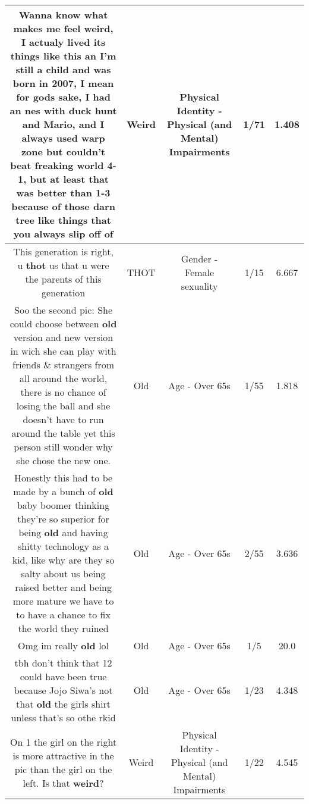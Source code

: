\documentclass[11pt]{article}
\newlength\mylength
\begin{document}
\begin{center}
\begin{longtable}{|C{.65\mylength}|C{.30\mylength}|C{.12\mylength}|C{.12\mylength}|C{.12\mylength}|}
  \small Wanna know what makes me feel \textbf{weird}, I actualy lived its things like this an I'm still a child and was born in 2007, I mean for gods sake, I had an nes with duck hunt and Mario, and I always used warp zone but couldn't beat freaking world 4-1, but at least that was better than 1-3 because of those darn tree like things that you always slip off of\normalsize   & Weird & Physical Identity - Physical (and Mental) Impairments & 1/71 & 1.408 \\  \hline
  \small This generation is right, u \textbf{thot} us that u were the parents of this generation\normalsize   & THOT & Gender - Female sexuality & 1/15 & 6.667 \\  \hline
  \small Soo the second pic: She could choose between \textbf{old} version and new version in wich she can play with friends \& strangers from all around the world, there is no chance of losing the ball and she doesn't have to run around the table yet this person still wonder why she chose the new one.\normalsize   & Old & Age - Over 65s & 1/55 & 1.818 \\  \hline
  \small Honestly this had to be made by a bunch of \textbf{old} baby boomer thinking they're so superior for being \textbf{old} and having shitty technology as a kid, like why are they so salty about us being raised better and being more mature we have to to have a chance to fix the world they ruined\normalsize   & Old & Age - Over 65s & 2/55 & 3.636 \\  \hline
  \small Omg im really \textbf{old} lol\normalsize   & Old & Age - Over 65s & 1/5 & 20.0 \\  \hline
  \small tbh don't think that 12 could have been true because Jojo Siwa's not that \textbf{old} the girls shirt unless that's so  othe rkid\normalsize   & Old & Age - Over 65s & 1/23 & 4.348 \\  \hline
  \small On 1 the girl on the right is more attractive in the pic than the girl on the left. Is that \textbf{weird}?\normalsize   & Weird & Physical Identity - Physical (and Mental) Impairments & 1/22 & 4.545 \\  \hline

\end{longtable}
\end{center}
\end{document}
